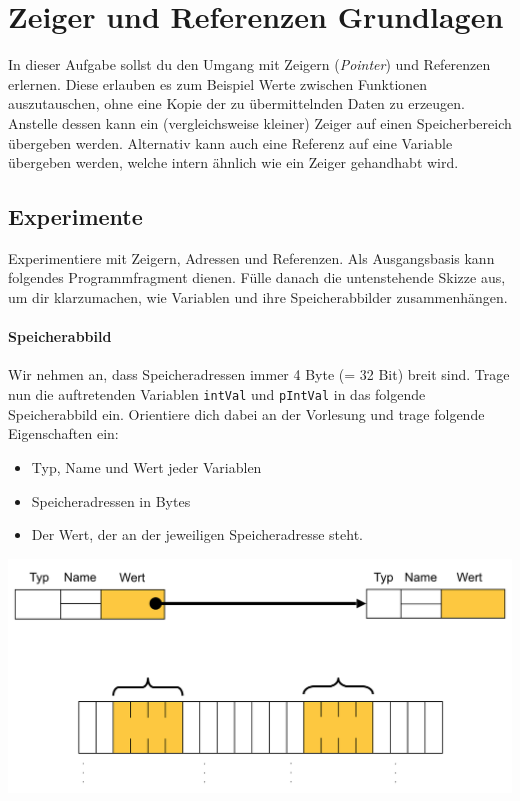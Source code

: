 \section{\ExercisePrefixMemory Zeiger und Referenzen Grundlagen}
\label{sec:pointers}
In dieser Aufgabe sollst du den Umgang mit Zeigern (\emph{Pointer}) und Referenzen erlernen.
Diese erlauben es zum Beispiel Werte zwischen Funktionen auszutauschen, ohne eine Kopie der zu übermittelnden Daten zu erzeugen.
Anstelle dessen kann ein (vergleichsweise kleiner) Zeiger auf einen Speicherbereich übergeben werden.
Alternativ kann auch eine Referenz auf eine Variable übergeben werden, welche intern ähnlich wie ein Zeiger gehandhabt wird.

\subsection{Experimente}
Experimentiere mit Zeigern, Adressen und Referenzen. Als Ausgangsbasis kann folgendes Programmfragment dienen.
Fülle danach die untenstehende Skizze aus, um dir klarzumachen, wie Variablen und ihre Speicherabbilder zusammenhängen.


\paragraph{Speicherabbild}
Wir nehmen an, dass Speicheradressen immer 4 Byte (= 32 Bit) breit sind. 
Trage nun die auftretenden Variablen \lstinline{intVal} und \lstinline{pIntVal} in das folgende Speicherabbild ein. Orientiere dich dabei an der Vorlesung und trage folgende Eigenschaften ein:
\begin{itemize}
	\item Typ, Name und Wert jeder Variablen
	\item Speicheradressen in Bytes
	\item Der Wert, der an der jeweiligen Speicheradresse steht.
\end{itemize}

\begin{center}
\includegraphics[width=.9\textwidth]{02_memory/figures/memory_image.png}
\end{center}

